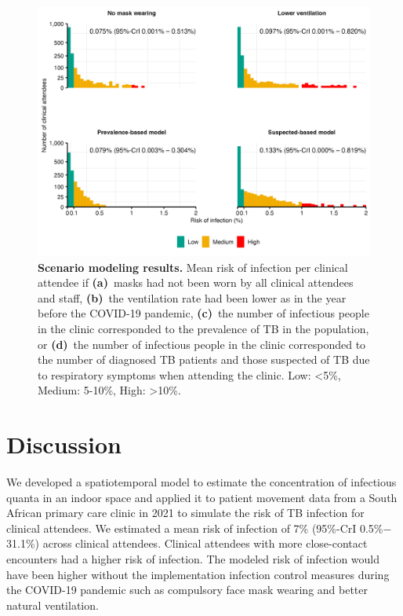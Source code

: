 \documentclass[fleqn,11pt]{wlscirep}
\begin{document}
\begin{figure}
    \centering
    \includegraphics{results/modeling/mean-roi-comparison.png}
    \caption{\textbf{Scenario modeling results.} Mean risk of infection per clinical attendee if \textbf{(a)}~masks had not been worn by all clinical attendees and staff, \textbf{(b)}~the ventilation rate had been lower as in the year before the COVID-19 pandemic, \textbf{(c)}~the number of infectious people in the clinic corresponded to the prevalence of TB in the population, or \textbf{(d)}~the number of infectious people in the clinic corresponded to the number of diagnosed TB patients and those suspected of TB due to respiratory symptoms when attending the clinic. Low: <5\%, Medium: 5-10\%, High: >10\%.}
    \label{fig:scenario-results}
\end{figure}


\FloatBarrier

\newpage

\section{Discussion}

We developed a spatiotemporal model to estimate the concentration of infectious quanta in an indoor space and applied it to patient movement data from a South African primary care clinic in 2021 to simulate the risk of TB infection for clinical attendees. We estimated a mean risk of infection of 7\% (95\%-CrI 0.5\%$-$31.1\%) across clinical attendees. Clinical attendees with more close-contact encounters had a higher risk of infection. The modeled risk of infection would have been higher without the implementation infection control measures during the COVID-19 pandemic such as compulsory face mask wearing and better natural ventilation. 
\end{document}
